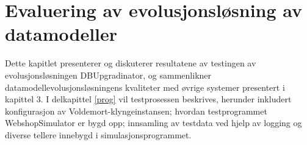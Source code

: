 
\chapter{Evaluering av evolusjonsløsning av datamodeller}

Dette kapitlet presenterer og diskuterer resultatene av testingen av evolusjons\-løsningen DBUpgradinator, og sammenlikner datamodellevolusjonsløsningens kvaliteter med øvrige systemer presentert i kapittel 3. I delkapittel \ref{prog} vil testprosessen beskrives, herunder inkludert konfigurasjon av Voldemort-klyngeinstansen; hvordan testprogrammet WebshopSimulator er bygd opp; innsamling av testdata ved hjelp av logging og diverse tellere innebygd i simulasjonsprogrammet.






\cleardoublepage

